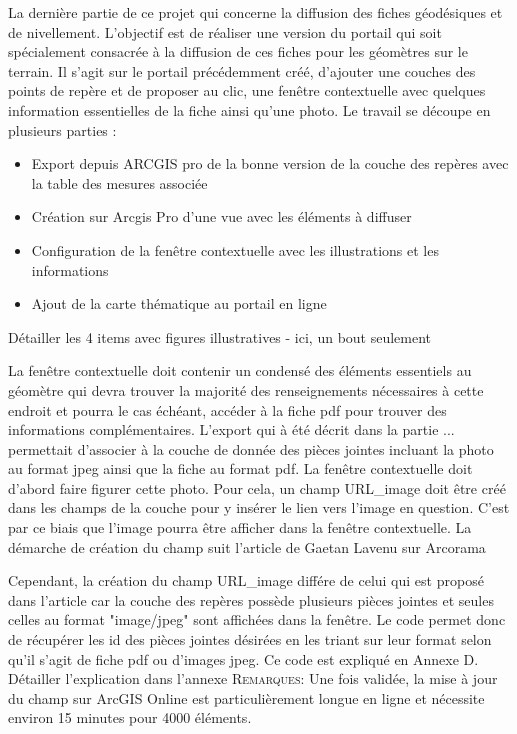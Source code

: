 La dernière partie de ce projet qui concerne la diffusion des fiches géodésiques et de nivellement. L'objectif est de réaliser une version du portail qui soit spécialement consacrée à la diffusion de ces fiches pour les géomètres sur le terrain.
Il s'agit sur le portail précédemment créé, d'ajouter une couches des points de repère et de proposer au clic, une fenêtre contextuelle avec quelques information essentielles de la fiche ainsi qu'une photo. Le travail se découpe en plusieurs parties : 
\begin{itemize}
    \item Export depuis ARCGIS pro de la bonne version de la couche des repères avec la table des mesures associée
    \item Création sur Arcgis Pro d'une vue avec les éléments à diffuser
    \item Configuration de la fenêtre contextuelle avec les illustrations et les informations
    \item Ajout de la carte thématique au portail en ligne
\end{itemize}

{\color{magenta} Détailler les 4 items avec figures illustratives - ici, un bout seulement}

La fenêtre contextuelle doit contenir un condensé des éléments essentiels au géomètre qui devra trouver la majorité des renseignements nécessaires à cette endroit et pourra le cas échéant, accéder à la fiche pdf pour trouver des informations complémentaires. L'export qui à été décrit dans la partie ... permettait d'associer à la couche de donnée des pièces jointes incluant la photo au format jpeg ainsi que la fiche au format pdf. La fenêtre contextuelle doit d'abord faire figurer cette photo. Pour cela, un champ URL\_image doit être créé dans les champs de la couche pour y insérer le lien vers l'image en question. C'est par ce biais que l'image pourra être afficher dans la fenêtre contextuelle. La démarche de création du champ suit l'article de Gaetan Lavenu sur Arcorama \cite{lavenu} 

Cependant, la création du champ URL\_image différe de celui qui est proposé dans l'article car la couche des repères possède plusieurs pièces jointes et seules celles au format "image/jpeg" sont affichées dans la fenêtre. Le code permet donc de récupérer les id des pièces jointes désirées en les triant sur leur format selon qu'il s'agit de fiche pdf ou d'images jpeg. Ce code est expliqué en Annexe D. 
{\color{magenta} Détailler l'explication dans l'annexe}
\textsc{Remarques:} Une fois validée, la mise à jour du champ sur ArcGIS Online est particulièrement longue en ligne et nécessite environ 15 minutes pour 4000 éléments.


